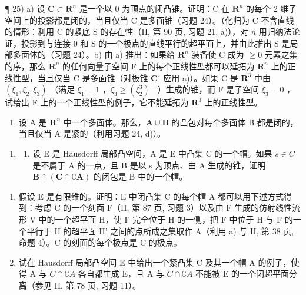 ¶ 25) a) 设 \(\mathbf{C} \subset \mathbf{R}^n\) 是一个以 0 为顶点的闭凸锥。证明：C 在 \(\mathbf{R}^n\) 的每个 2 维子空间上的投影都是闭的，当且仅当 C 是多面锥（习题 24）。（化归为 C 不含直线的情形：利用 C 的紧底 S 的存在性（II, 第 90 页, 习题 21, a)），对 \(n\) 用归纳法论证，投影到与连接 0 和 S 的一个极点的直线平行的超平面上，并由此推出 S 是局部多面体的（习题 24）。b) 由 a) 推出：如果给 \(\mathbf{R}^n\) 装备使 C 成为 \(\geqslant 0\) 元素之集的序，那么 \(\mathbf{R}^n\) 的任何向量子空间 F 上的每个正线性型都可以延拓为 \(\mathbf{R}^n\) 上的正线性型，当且仅当 C 是多面锥（对极锥 \(\mathbf{C}^\circ\) 应用 a)）。如果 C 是 \(\mathbf{R}^3\) 中由 \((\xi_1, \xi_2, \xi_3)\) （满足 \(\xi_1 = 1\) ，\(\xi_3 \geqslant (\xi_2^3)^-\) ）生成的锥，而 F 是子空间 \(\xi_3 = 0\) ，试给出 F 上的一个正线性型的例子，它不能延拓为 \(\mathbf{R}^3\) 上的正线性型。

\begin{enumerate}
\def\labelenumi{\alph{enumi})}
\setcounter{enumi}{2}
\tightlist
\item
  设 A 是 \(\mathbf{R}^n\) 中一个多面体。那么，\(\mathbf{A} \cup \mathbf{B}\) 的凸包对每个多面体 B 都是闭的，当且仅当 A 是紧的（利用习题 24, d)）。
\end{enumerate}

\begin{enumerate}
\def\labelenumi{\arabic{enumi})}
\setcounter{enumi}{25}
\tightlist
\item
  \begin{enumerate}
  \def\labelenumii{\alph{enumii})}
  \tightlist
  \item
    设 E 是 Hausdorff 局部凸空间，A 是 E 中凸集 C 的一个帽。如果 \(s \in C\) 是不属于 A 的一点，且 B 是以 s 为顶点、由 A 生成的锥，证明 \(\mathbf{B} \cap (\mathbf{C} \cap \complement\mathbf{A})\) 的闭包是 B 中的一个帽。
  \end{enumerate}
\end{enumerate}

\begin{enumerate}
\def\labelenumi{\alph{enumi})}
\setcounter{enumi}{1}
\item
  假设 E 是有限维的。证明：E 中闭凸集 C 的每个帽 A 都可以用下述方式得到：考虑 C 的一个刻面 F（II, 第 87 页, 习题 3）以及由 F 生成的仿射线性流形 V 中的一个超平面 H，使 F 完全位于 H 的一侧，把 F 中位于 H 与 F 的一个平行于 H 的超平面 H' 之间的点所成之集取作 A（利用 a) 与 II, 第 38 页, 命题 4）。C 的刻面的每个极点是 C 的极点。
\item
  试在 Hausdorff 局部凸空间 E 中给出一个紧凸集 C 及其一个帽 A 的例子，使得 A 与 \(C \cap \complement A\) 各自都生成 E，且 A 与 \(C \cap \complement A\) 不能被 E 的一个闭超平面分离（参见 II, 第 78 页, 习题 11）。
\end{enumerate}

